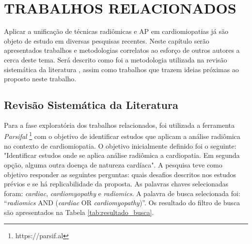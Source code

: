 \chapter{TRABALHOS RELACIONADOS} 
\label{chap:trab_relacionados}


Aplicar a unificação de técnicas radiômicas e \gls{AP} em cardiomiopatias já são objeto de estudo em diversas pesquisas recentes.
Neste capítulo serão apresentados trabalhos e metodologias correlatos ao esforço de outros autores a cerca deste tema. Será descrito como foi a metodologia utilizada na revisão sistemática da literatura \cite{petersenGuidelinesConductingSystematic2015a}, assim como trabalhos que trazem ideias próximas ao proposto neste trabalho.

\section{Revisão Sistemática da Literatura} 
\label{sec:rev_sistematica}

Para a fase exploratória dos trabalhos relacionados, foi utilizada a ferramenta \textit{Parsifal} \footnote{https://parsif.al} com o objetivo de identificar estudos que aplicam a análise radiômica no contexto de cardiomiopatia. O objetivo inicialmente definido foi o seguinte: "Identificar estudos onde se aplica análise radiômica a cardiopatia. Em segunda opção, alguma outra doença de natureza cardíaca". A pesquisa teve como objetivo responder as seguintes perguntas: quais desafios descritos nos estudos prévios e se há replicabilidade da proposta. As palavras chaves selecionadas foram: \textit{cardiac}, \textit{cardiomyopathy} e \textit{radiomics}. A palavra de busca selecionada foi: ``\textit{radiomics} AND (\textit{cardiac} OR \textit{cardiomyopathy})''. Os resultado do filtro de busca são apresentados na Tabela \ref{tab:resultado_busca}. 


